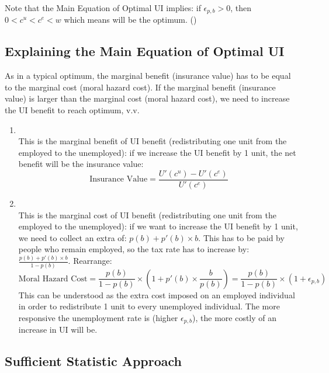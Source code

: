         Note that the Main Equation of Optimal UI implies: if $\epsilon_{p,b}>0$, then $0<c^u<c^e<w$ which means  will be the optimum. ()
        
    \subsection{Explaining the Main Equation of Optimal UI}
        As in a typical optimum, the marginal benefit (insurance value) has to be equal to the marginal cost (moral hazard cost). If the marginal benefit (insurance value) is larger than the marginal cost (moral hazard cost), we need to increase the UI benefit to reach optimum, v.v.
        \begin{enumerate}
            \item \textbf{}\\
            This is the marginal benefit of UI benefit (redistributing one unit from the employed to the unemployed): if we increase the UI benefit by 1 unit, the net benefit will be the insurance value:
            $$\text{Insurance\ Value} = \frac{U'(c^u)-U'(c^e)}{U'(c^e)}$$
            \item \textbf{}\\
            This is the marginal cost of UI benefit (redistributing one unit from the employed to the unemployed): if we want to increase the UI benefit by 1 unit, we need to collect an extra of: $p(b) + p'(b)\times b$. This has to be paid by people who remain employed, so the tax rate has to increase by: $\frac{p(b)+p'(b)\times{b}}{1-p(b)}$. Rearrange:
            $$\text{Moral\ Hazard\ Cost} = \frac{p(b)}{1-p(b)}\times\left(1+p'(b)\times\frac{b}{p(b)}\right) = \frac{p(b)}{1-p(b)}\times(1+\epsilon_{p,b})$$
            This can be understood as the extra cost imposed on an employed individual in order to redistribute 1 unit to every unemployed individual. The more responsive the unemployment rate is (higher $\epsilon_{p,b}$), the more costly of an increase in UI will be.
        \end{enumerate}
        
    \subsection{Sufficient Statistic Approach}
    

